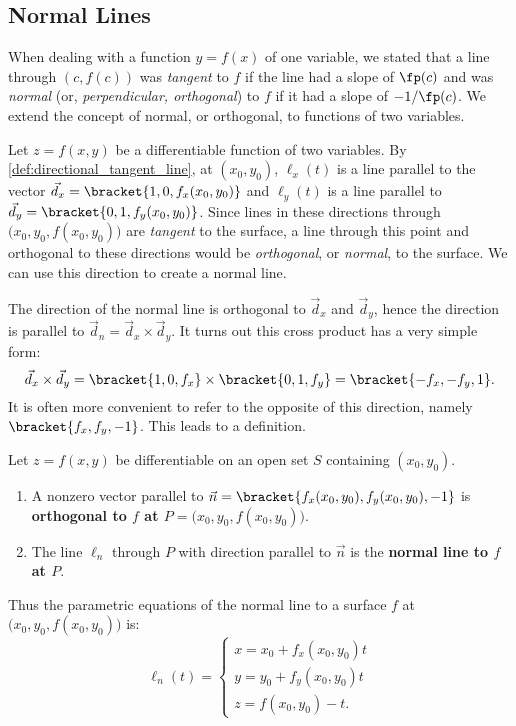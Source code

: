 \subsection*{Normal Lines}

When dealing with a function $y=f(x)$ of one variable, we stated that a line through $(c,f(c))$ was \textit{tangent} to $f$ if the line had a slope of $\fp(c)$ and was \textit{normal} (or, \textit{perpendicular, orthogonal}) to $f$ if it had a slope of $-1/\fp(c)$. We extend the concept of normal, or orthogonal, to functions of two variables. 

Let $z=f(x,y)$ be a differentiable function of two variables. By \autoref{def:directional_tangent_line}, at $(x_0,y_0)$, $\ell_x(t)$ is a line parallel to the vector $\vec d_x=\bracket{1,0,f_x(x_0,y_0)}$ and $\ell_y(t)$ is a line parallel to $\vec d_y=\bracket{0,1,f_y(x_0,y_0)}$. Since lines in these directions through $\big(x_0,y_0,f(x_0,y_0)\big)$ are \textit{tangent} to the surface, a line through this point and orthogonal to these directions would be \textit{orthogonal}, or \textit{normal}, to the surface. We can use this direction to create a normal line.

The direction of the normal line is orthogonal to $\vec d_x$ and $\vec d_y$, hence the direction is parallel to $\vec d_n = \vec d_x\times \vec d_y$. It turns out this cross product has a very simple form:
$$ \vec d_x\times \vec d_y =\bracket{1,0,f_x}\times\bracket{0,1,f_y}=\bracket{-f_x,-f_y,1}.$$
It is often more convenient to refer to the opposite of this direction, namely $\bracket{f_x,f_y,-1}$. This leads to a definition.


{Let $z=f(x,y)$ be differentiable on an open set $S$ containing $(x_0,y_0)$.

\begin{enumerate}
\item	A nonzero vector parallel to $\vec n=\bracket{f_x(x_0,y_0),f_y(x_0,y_0),-1}$ is \textbf{orthogonal to $f$ at $P=\big(x_0,y_0,f(x_0,y_0)\big)$}.

\item The line $\ell_n$ through $P$ with direction parallel to $\vec n$ is the \textbf{normal line to $f$ at $P$}.
\end{enumerate}}

Thus the parametric equations of the normal line to a surface $f$ at $\big(x_0,y_0,f(x_0,y_0)\big)$ is:
\[
\ell_{n}(t) =
\begin{cases}
x = x_0 + f_x(x_0,y_0)t \\
y = y_0 + f_y(x_0,y_0)t \\
z = f(x_0,y_0) - t.
\end{cases}
\]

